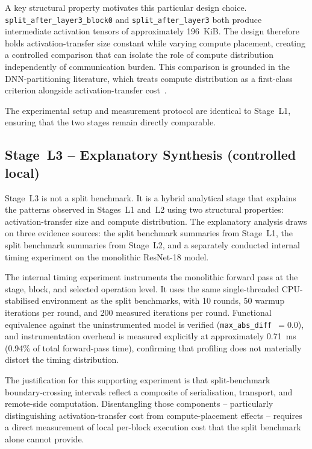 A key structural property motivates this particular design choice.
\texttt{split\_after\_layer3\_block0} and \texttt{split\_after\_layer3} both produce
intermediate activation tensors of approximately 196~KiB.
The design therefore holds activation-transfer size constant while varying compute
placement, creating a controlled comparison that can isolate the role of compute
distribution independently of communication burden.
This comparison is grounded in the DNN-partitioning literature, which treats compute
distribution as a first-class criterion alongside activation-transfer
cost~\cite{dnnsplit,fine_grained_partitioning}.

The experimental setup and measurement protocol are identical to Stage~L1, ensuring that
the two stages remain directly comparable.

\subsection{Stage~L3 -- Explanatory Synthesis (controlled local)}
\label{sec:methods-rq13}

Stage~L3 is not a split benchmark.
It is a hybrid analytical stage that explains the patterns observed in Stages~L1 and~L2
using two structural properties: activation-transfer size and compute distribution.
The explanatory analysis draws on three evidence sources: the split benchmark summaries
from Stage~L1, the split benchmark summaries from Stage~L2, and a separately conducted
internal timing experiment on the monolithic ResNet-18 model.

The internal timing experiment instruments the monolithic forward pass at the stage,
block, and selected operation level.
It uses the same single-threaded CPU-stabilised environment as the split benchmarks,
with 10 rounds, 50 warmup iterations per round, and 200 measured iterations per round.
Functional equivalence against the uninstrumented model is verified
(\texttt{max\_abs\_diff}~$= 0.0$), and instrumentation overhead is measured explicitly
at approximately 0.71~ms (0.94\% of total forward-pass time), confirming that
profiling does not materially distort the timing distribution.

The justification for this supporting experiment is that split-benchmark
boundary-crossing intervals reflect a composite of serialisation, transport, and
remote-side computation.
Disentangling those components -- particularly distinguishing activation-transfer cost
from compute-placement effects -- requires a direct measurement of local per-block
execution cost that the split benchmark alone cannot provide.

